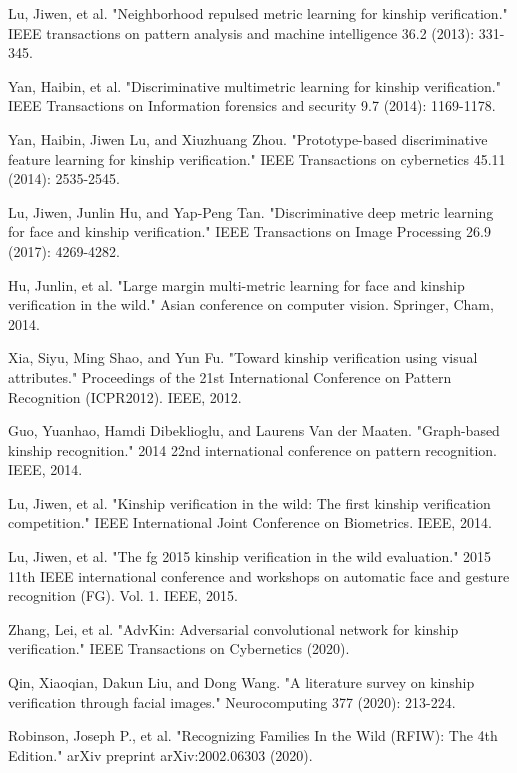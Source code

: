 \documentclass[a4paper, 10pt, conference]{ieeeconf}      %
\begin{document}
\begin{thebibliography}{99}
Lu, Jiwen, et al. "Neighborhood repulsed metric learning for kinship verification." IEEE transactions on pattern analysis and machine intelligence 36.2 (2013): 331-345.

Yan, Haibin, et al. "Discriminative multimetric learning for kinship verification." IEEE Transactions on Information forensics and security 9.7 (2014): 1169-1178.

Yan, Haibin, Jiwen Lu, and Xiuzhuang Zhou. "Prototype-based discriminative feature learning for kinship verification." IEEE Transactions on cybernetics 45.11 (2014): 2535-2545.

Lu, Jiwen, Junlin Hu, and Yap-Peng Tan. "Discriminative deep metric learning for face and kinship verification." IEEE Transactions on Image Processing 26.9 (2017): 4269-4282.

Hu, Junlin, et al. "Large margin multi-metric learning for face and kinship verification in the wild." Asian conference on computer vision. Springer, Cham, 2014.

Xia, Siyu, Ming Shao, and Yun Fu. "Toward kinship verification using visual attributes." Proceedings of the 21st International Conference on Pattern Recognition (ICPR2012). IEEE, 2012.

Guo, Yuanhao, Hamdi Dibeklioglu, and Laurens Van der Maaten. "Graph-based kinship recognition." 2014 22nd international conference on pattern recognition. IEEE, 2014.

Lu, Jiwen, et al. "Kinship verification in the wild: The first kinship verification competition." IEEE International Joint Conference on Biometrics. IEEE, 2014.

Lu, Jiwen, et al. "The fg 2015 kinship verification in the wild evaluation." 2015 11th IEEE international conference and workshops on automatic face and gesture recognition (FG). Vol. 1. IEEE, 2015.

Zhang, Lei, et al. "AdvKin: Adversarial convolutional network for kinship verification." IEEE Transactions on Cybernetics (2020).

Qin, Xiaoqian, Dakun Liu, and Dong Wang. "A literature survey on kinship verification through facial images." Neurocomputing 377 (2020): 213-224.

Robinson, Joseph P., et al. "Recognizing Families In the Wild (RFIW): The 4th Edition." arXiv preprint arXiv:2002.06303 (2020).


\end{thebibliography}
\end{document}

